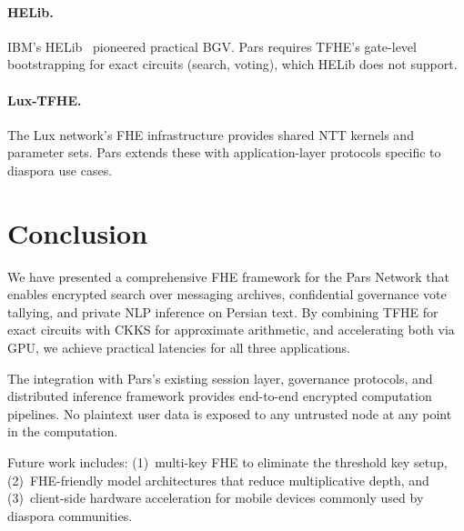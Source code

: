 \documentclass[11pt,a4paper]{article}
\begin{document}
\paragraph{HELib.}  IBM's HELib~\cite{halevi2014helib} pioneered
practical BGV.  Pars requires TFHE's gate-level bootstrapping for
exact circuits (search, voting), which HELib does not support.

\paragraph{Lux-TFHE.}  The Lux network's FHE infrastructure provides
shared NTT kernels and parameter sets.  Pars extends these with
application-layer protocols specific to diaspora use cases.

\section{Conclusion}
\label{sec:conclusion}

We have presented a comprehensive FHE framework for the Pars Network
that enables encrypted search over messaging archives, confidential
governance vote tallying, and private NLP inference on Persian text.
By combining TFHE for exact circuits with CKKS for approximate
arithmetic, and accelerating both via GPU, we achieve practical
latencies for all three applications.

The integration with Pars's existing session layer, governance
protocols, and distributed inference framework provides end-to-end
encrypted computation pipelines.  No plaintext user data is exposed
to any untrusted node at any point in the computation.

Future work includes: (1)~multi-key FHE to eliminate the threshold
key setup, (2)~FHE-friendly model architectures that reduce
multiplicative depth, and (3)~client-side hardware acceleration
for mobile devices commonly used by diaspora communities.
\end{document}
